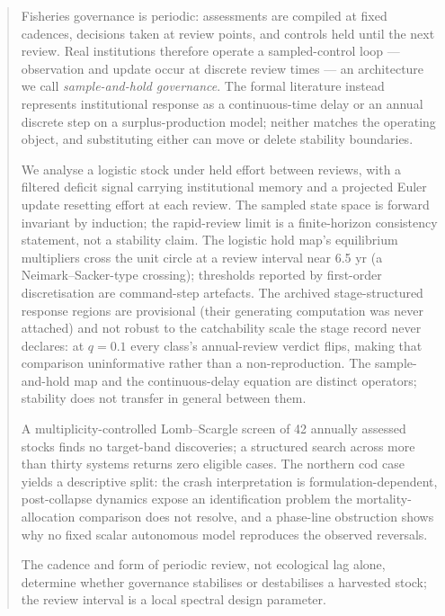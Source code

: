 \documentclass[11pt]{article}
\begin{document}
\begin{abstract}


Fisheries governance is periodic: assessments are compiled at fixed
cadences, decisions taken at review points, and controls held until the
next review. Real institutions therefore operate a sampled-control loop
--- observation and update occur at discrete review times --- an
architecture we call \emph{sample-and-hold governance}. The formal
literature instead represents institutional response as a
continuous-time delay or an annual discrete step on a surplus-production
model; neither matches the operating object, and substituting either can
move or delete stability boundaries.

We analyse a logistic stock under held effort between reviews, with a
filtered deficit signal carrying institutional memory and a projected
Euler update resetting effort at each review. The sampled state space is
forward invariant by induction; the rapid-review limit is a
finite-horizon consistency statement, not a stability claim. The
logistic hold map's equilibrium multipliers cross the unit circle at a
review interval near 6.5 yr (a Neimark--Sacker-type crossing);
thresholds reported by first-order discretisation are command-step
artefacts. The archived stage-structured response regions are
provisional (their generating computation was never attached) and not
robust to the catchability scale the stage record never declares: at
\(q = 0.1\) every class's annual-review verdict flips, making that
comparison uninformative rather than a non-reproduction. The
sample-and-hold map and the continuous-delay equation are distinct
operators; stability does not transfer in general between them.

A multiplicity-controlled Lomb--Scargle screen of 42 annually assessed
stocks finds no target-band discoveries; a structured search across more
than thirty systems returns zero eligible cases. The northern cod case
yields a descriptive split: the crash interpretation is
formulation-dependent, post-collapse dynamics expose an identification
problem the mortality-allocation comparison does not resolve, and a
phase-line obstruction shows why no fixed scalar autonomous model
reproduces the observed reversals.

The cadence and form of periodic review, not ecological lag alone,
determine whether governance stabilises or destabilises a harvested
stock; the review interval is a local spectral design parameter.

\end{abstract}
\end{document}

